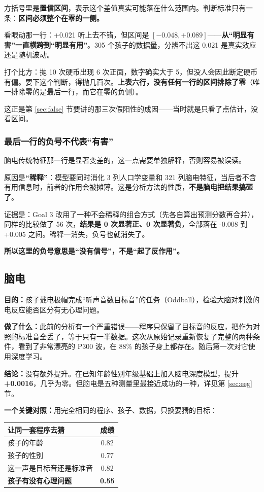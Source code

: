 \documentclass[UTF8,12pt,a4paper]{ctexart}
\newcommand{\key}[1]{\textbf{\textcolor{blue!45!black}{#1}}}
\begin{document}
方括号里是\key{置信区间}，表示这个差值真实可能落在什么范围内。判断标准只有一条：\key{区间必须整个在零的一侧。}

看眼动那一行：+0.021 听上去不错，但区间是 $[-0.048, +0.089]$——\key{从“明显有害”一直横跨到“明显有用”}。305 个孩子的数据量，分辨不出这 0.021 是真实效应还是随机波动。

打个比方：抛 10 次硬币出现 6 次正面，数字确实大于 5，但没人会因此断定硬币有偏。要下这个判断，得抛几百次。\key{上表六行，没有任何一行的区间排除了零}（唯一排除零的是最后一行，而它在零的负侧）。

这正是第 \ref{sec:false} 节要讲的那三次假阳性的成因——当时就是只看了点估计，没看区间。

\subsubsection*{最后一行的负号不代表“有害”}

脑电传统特征那一行是显著变差的，这一点需要单独解释，否则容易被误读。

原因是\key{“稀释”}：模型要同时消化 3 列人口学变量和 321 列脑电特征，当后者不含有用信息时，前者的作用会被摊薄。这是分析方法的性质，\key{不是脑电把结果搞砸了}。

证据是：Goal 3 改用了一种不会稀释的组合方式（先各自算出预测分数再合并），同样的比较做了 56 次，\key{结果是 0 次显著正、0 次显著负}，全部落在 -0.008 到 +0.005 之间。稀释一消失，负号也就消失了。

\key{所以这里的负号意思是“没有信号”，不是“起了反作用”。}

\subsection{脑电}

\key{目的：}孩子戴电极帽完成“听声音数目标音”的任务（Oddball），检验大脑对刺激的电反应能否区分有无心理问题。

\key{做了什么：}此前的分析有一个严重错误——程序只保留了目标音的反应，把作为对照的标准音全丢了，等于只有一半数据。这次从原始记录重新恢复了完整的两种条件，看到了非常漂亮的 P300 波，在 88\% 的孩子身上都存在。随后第一次对它使用深度学习。

\key{结论：}没有额外提升。在已知年龄性别年级基础上加入脑电深度模型，提升 \key{+0.0016}，几乎为零。但脑电是五种测量里最接近成功的一种，详见第 \ref{sec:eeg} 节。

\key{一个关键对照：}用完全相同的程序、孩子、数据，只换要猜的目标：

\begin{center}
\begin{tabular}{@{}lc@{}}
\toprule
\textbf{让同一套程序去猜} & \textbf{成绩} \\
\midrule
孩子的年龄 & 0.82 \\
孩子的性别 & 0.77 \\
这一声是目标音还是标准音 & 0.82 \\
\textbf{孩子有没有心理问题} & \textbf{0.55} \\
\bottomrule
\end{tabular}
\end{center}
\end{document}
